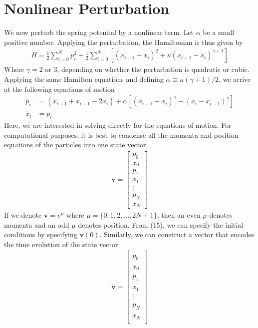\documentclass{article}
\newcommand{\ve}{\mathbf}
\begin{document}
\section{Nonlinear Perturbation}
We now perturb the spring potential by a nonlinear term. Let $\alpha$ be a small 
positive number. Applying the perturbation, the Hamiltonian is thus given by 
\begin{align}
    H=\frac{1}{2}\sum_{i=0}^Np_i^2+\frac{1}{2}\sum_{i=0}^N[  (x_{i+1}-x_i)^2 + \kappa (x_{i+1}-x_i)^{\gamma+1} ]
\end{align}
Where $\gamma=2$ or 3, depending on whether the perturbation is quadratic or cubic. 
Applying the same Hamilton equations and defining $\alpha\equiv\kappa(\gamma+1)/2$, we arrive at the following equations of motion 
\begin{align}
    \dot{p_i}&=(x_{i+1}+x_{i-1}-2x_i)+\alpha [(x_{i+1}-x_i)^\gamma-(x_i-x_{i-1})^\gamma]\\
    \dot{x_i}&=p_i
\end{align}
Here, we are interested in solving directly for the equations of motion. For computational purposes, 
it is best to condense all the momenta and position equations of the particles
into one state vector
\begin{align}
    \ve{v}=\begin{bmatrix}
        p_0\\ 
    x_0\\ 
    p_1\\ 
    x_1\\ 
    \vdots\\ 
    p_N\\ 
    x_N
    \end{bmatrix}
\end{align}
If we denote $\ve{v}=v^\mu$ where $\mu=\{ 0, 1, 2, ..., 2N+1\}$, 
then an even $\mu$ denotes momenta  and an odd $\mu$ denotes position.
From (15), we can specify the initial conditions by specifying $\ve{v}(0)$.
Similarly, we can construct a vector 
that encodes the time evolution of the state vector 
\begin{align}
    \dot{\ve{v}}=\begin{bmatrix}
    \dot{p}_0\\ 
    \dot{x}_0\\ 
    \dot{p}_1\\ 
    \dot{x}_1\\ 
    \vdots\\ 
    \dot{p}_N\\ 
    \dot{x}_N\\ 
    \end{bmatrix}
\end{align}
\end{document}
